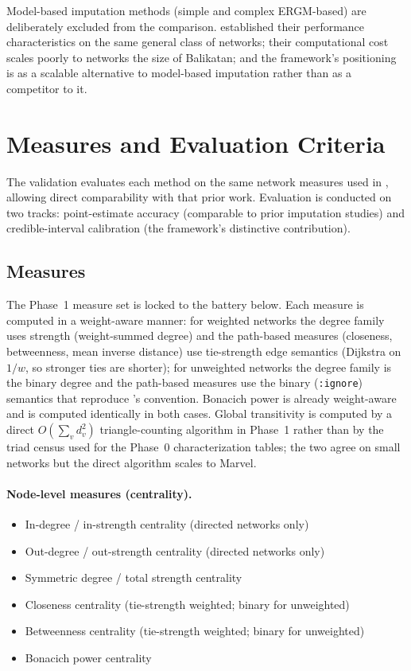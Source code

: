 \documentclass[11pt]{article}
\begin{document}
Model-based imputation methods (simple and complex ERGM-based) are deliberately excluded from the comparison. \citet{SmithMorganMoody2022} established their performance characteristics on the same general class of networks; their computational cost scales poorly to networks the size of Balikatan; and the framework's positioning is as a scalable alternative to model-based imputation rather than as a competitor to it.

\section{Measures and Evaluation Criteria}

The validation evaluates each method on the same network measures used in \citet{SmithMorganMoody2022}, allowing direct comparability with that prior work. Evaluation is conducted on two tracks: point-estimate accuracy (comparable to prior imputation studies) and credible-interval calibration (the framework's distinctive contribution).

\subsection{Measures}

The Phase~1 measure set is locked to the battery below. Each measure is computed in a weight-aware manner: for weighted networks the degree family uses strength (weight-summed degree) and the path-based measures (closeness, betweenness, mean inverse distance) use tie-strength edge semantics (Dijkstra on $1/w$, so stronger ties are shorter); for unweighted networks the degree family is the binary degree and the path-based measures use the binary (\texttt{:ignore}) semantics that reproduce \citet{SmithMorganMoody2022}'s convention. Bonacich power is already weight-aware and is computed identically in both cases. Global transitivity is computed by a direct $O(\sum_v d_v^2)$ triangle-counting algorithm in Phase~1 rather than by the triad census used for the Phase~0 characterization tables; the two agree on small networks but the direct algorithm scales to Marvel.

\paragraph{Node-level measures (centrality).}
\begin{itemize}[leftmargin=*, itemsep=2pt]
  \item In-degree / in-strength centrality (directed networks only)
  \item Out-degree / out-strength centrality (directed networks only)
  \item Symmetric degree / total strength centrality
  \item Closeness centrality (tie-strength weighted; binary for unweighted)
  \item Betweenness centrality (tie-strength weighted; binary for unweighted)
  \item Bonacich power centrality
\end{itemize}
\end{document}
